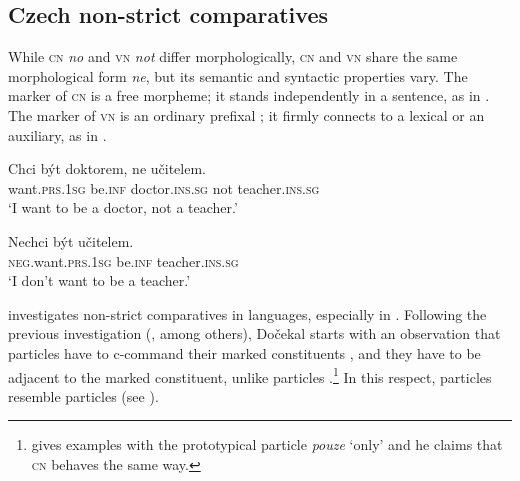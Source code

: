 \documentclass[output=paper, colorlinks, citecolor=brown, newtxmath]{langsci/langscibook}
\begin{document}
\subsection{Czech non-strict comparatives}

While  \textsc{cn} \textit{no} and \textsc{vn} \textit{not} differ morphologically,   \textsc{cn} and \textsc{vn} share the same morphological form \textit{ne}, but its semantic and syntactic properties vary. The marker of \textsc{cn} is a free morpheme; it stands independently in a sentence, as in . The marker of \textsc{vn} is an ordinary prefixal ; it firmly connects to a lexical  or an auxiliary, as in .

\ea
\gll Chci být doktorem, ne učitelem.\\
want.\textsc{prs.1sg} be.\textsc{inf} doctor.\textsc{ins.sg} not teacher.\textsc{ins.sg}\\
\glt `I want to be a doctor, not a teacher.' \label{ex:cz_cn}
\z

\ea
\gll Nechci být učitelem.\\
\textsc{neg}.want.\textsc{prs.1sg} be.\textsc{inf} teacher.\textsc{ins.sg}\\
\glt `I don't want to be a teacher.' \label{ex:cz_vn}
\z


\noindent \cite{dovcekal2017upper} investigates non-strict comparatives in  languages, especially in . Following the previous investigation (\citealt{jasinskaja2016information}, among others), Dočekal starts with an observation that   particles have to c-command their  marked constituents , and they have to be adjacent to the  marked constituent, unlike   particles .\footnote{\cite{dovcekal2017upper} gives examples with the  prototypical  particle \textit{pouze} `only' and he claims that  \textsc{cn} behaves the same way.} In this respect,   particles resemble   particles (see \citealt{buring2001v3}).
\end{document}
